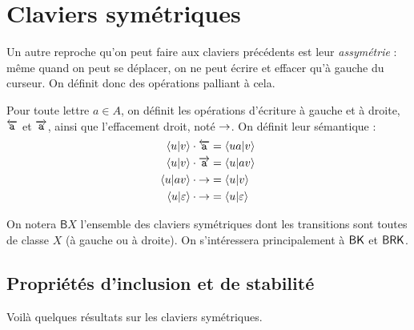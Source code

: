 \documentclass[12pt, a4paper]{article}
\begin{document}
    \section{Claviers symétriques}
    Un autre reproche qu'on peut faire aux claviers précédents est leur \emph{assymétrie} : même quand on peut se déplacer, on ne peut écrire et effacer qu'à gauche du curseur.
    On définit donc des opérations palliant à cela.
    \begin{defopsym}
        Pour toute lettre $a \in A$, on définit les opérations d'écriture à gauche et à droite, $\overleftarrow{\mathtt{a}}$ et $\overrightarrow{\mathtt{a}}$, ainsi que l'effacement droit, noté $\mathord{\rightarrow}$.
        On définit leur sémantique :
        \begin{align*}
            \left\langle u \middle| v \right\rangle \cdot \overleftarrow{\mathtt{a}} &= \left\langle ua \middle| v \right\rangle   \\
            \left\langle u \middle| v \right\rangle \cdot \overrightarrow{\mathtt{a}} &= \left\langle u \middle| av \right\rangle   \\
            \left\langle u \middle| av \right\rangle \cdot \mathord{\rightarrow} &= \left\langle u \middle| v \right\rangle        \\
            \left\langle u \middle| \varepsilon \right\rangle \cdot \mathord{\rightarrow} &= \left\langle u \middle| \varepsilon \right\rangle
        \end{align*}
    \end{defopsym}
    On notera $\mathsf{B}X$ l'ensemble des claviers symétriques dont les transitions sont toutes de classe $X$ (à gauche ou à droite). On s'intéressera principalement à $\mathsf{BK}$ et $\mathsf{BRK}$.
    \subsection{Propriétés d'inclusion et de stabilité}
    Voilà quelques résultats sur les claviers symétriques.
\end{document}
